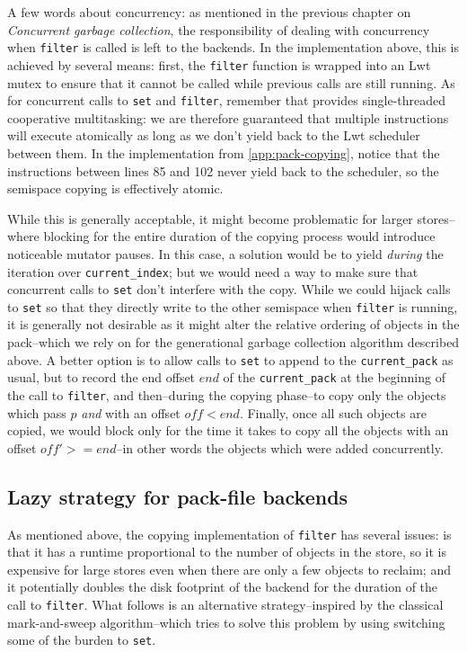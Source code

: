 \bigskip
A few words about concurrency: as mentioned in the previous chapter on \emph{Concurrent garbage collection}, the responsibility of dealing with concurrency when \texttt{filter} is called is left to the backends. In the implementation above, this is achieved by several means: first, the \texttt{filter} function is wrapped into an Lwt mutex to ensure that it cannot be called while previous calls are still running. As for concurrent calls to \texttt{set} and \texttt{filter}, remember that provides single-threaded cooperative multitasking: we are therefore guaranteed that multiple instructions will execute atomically as long as we don't yield back to the Lwt scheduler between them. In the implementation from \cref{app:pack-copying}, notice that the instructions between lines 85 and 102 never yield back to the scheduler, so the semispace copying is effectively atomic.

While this is generally acceptable, it might become problematic for larger stores--where blocking for the entire duration of the copying process would introduce noticeable mutator pauses. In this case, a solution would be to yield \emph{during} the iteration over \texttt{current\_index}; but we would need a way to make sure that concurrent calls to \texttt{set} don't interfere with the copy. While we could hijack calls to \texttt{set} so that they directly write to the other semispace when \texttt{filter} is running, it is generally not desirable as it might alter the relative ordering of objects in the pack--which we rely on for the generational garbage collection algorithm described above. A better option is to allow calls to \texttt{set} to append to the \texttt{current\_pack} as usual, but to record the end offset \(end\) of the \texttt{current\_pack} at the beginning of the call to \texttt{filter}, and then--during the copying phase--to copy only the objects which pass \(p\) \emph{and} with an offset \(off < end\). Finally, once all such objects are copied, we would block only for the time it takes to copy all the objects with an offset \(off' >= end\)--in other words the objects which were added concurrently.

\subsection{Lazy strategy for pack-file backends}

As mentioned above, the copying implementation of \texttt{filter} has several issues: is that it has a runtime proportional to the number of objects in the store, so it is expensive for large stores even when there are only a few objects to reclaim; and it potentially doubles the disk footprint of the backend for the duration of the call to \texttt{filter}. What follows is an alternative strategy--inspired by the classical mark-and-sweep algorithm--which tries to solve this problem by using switching some of the burden to \texttt{set}.


